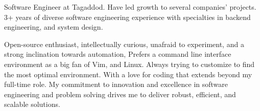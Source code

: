 

\begin{cvparagraph}

Software Engineer at Tagaddod. Have led growth to several companies' projects. 3+ years of diverse software engineering experience with specialties in backend engineering, and system design.

Open-source enthusiast, intellectually curious, unafraid to experiment, and a strong inclination towards automation, Prefers a command line interface environment as a big fan of Vim, and Linux. Always trying to customize to find the most optimal environment. With a love for coding that extends beyond my full-time role. My commitment to innovation and excellence in software engineering and problem solving drives me to deliver robust, efficient, and scalable solutions.
\end{cvparagraph}
